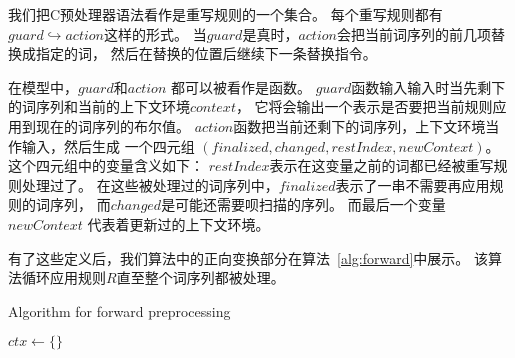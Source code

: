 我们把C预处理器语法看作是重写规则的一个集合。
每个重写规则都有$guard \hookrightarrow action$这样的形式。
当$guard$是真时，$action$会把当前词序列的前几项替换成指定的词，
然后在替换的位置后继续下一条替换指令。

在模型中，$guard$和$action$ 都可以被看作是函数。
$guard$函数输入输入时当先剩下的词序列和当前的上下文环境$context$，
它将会输出一个表示是否要把当前规则应用到现在的词序列的布尔值。
$action$函数把当前还剩下的词序列，上下文环境当作输入，然后生成
一个四元组 $(finalized, changed, 
restIndex, newContext)$。
这个四元组中的变量含义如下：
$restIndex$表示在这变量之前的词都已经被重写规则处理过了。
在这些被处理过的词序列中，$finalized$表示了一串不需要再应用规则的词序列，
而$changed$是可能还需要呗扫描的序列。
而最后一个变量$newContext$ 代表着更新过的上下文环境。

有了这些定义后，我们算法中的正向变换部分在算法~\ref{alg:forward}中展示。
该算法循环应用规则$R$直至整个词序列都被处理。



\begin{algorithm}
  \newcommand\mycommfont[1]{\rmfamily{#1}}
  \caption{Algorithm for forward preprocessing  \label{alg:forward}}
  $ctx \leftarrow \{\}$\;
\end{algorithm}

